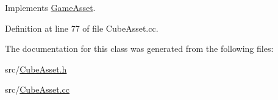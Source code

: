 Implements \hyperlink{class_game_asset_a961aa51ca0a9961fc584c0b5d5431300}{Game\+Asset}.



Definition at line 77 of file Cube\+Asset.\+cc.



The documentation for this class was generated from the following files\+:\begin{DoxyCompactItemize}
\item 
src/\hyperlink{_cube_asset_8h}{Cube\+Asset.\+h}\item 
src/\hyperlink{_cube_asset_8cc}{Cube\+Asset.\+cc}\end{DoxyCompactItemize}
